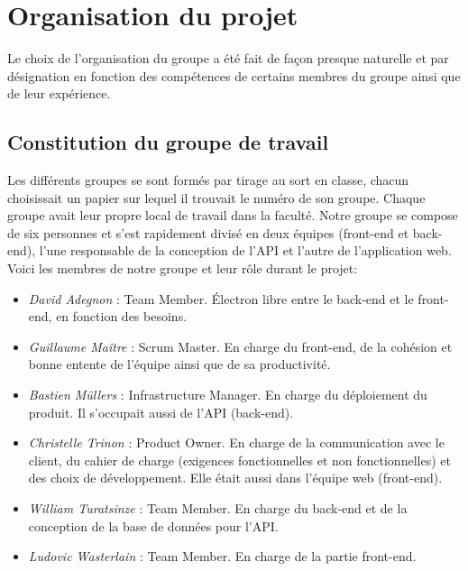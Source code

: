 \documentclass[t, 12pt, usenames,dvipsnames]{article}
\begin{document}
    \section{Organisation du projet}
        \noindent Le choix de l'organisation du groupe a été fait de façon presque naturelle et par désignation en fonction des compétences de certains membres du groupe ainsi que de leur expérience.
        
        \subsection{Constitution du groupe de travail}
            \noindent Les différents groupes se sont formés par tirage au sort en classe, chacun choisissait un papier sur lequel il trouvait le numéro de son groupe. Chaque groupe avait leur propre local de travail dans la faculté. Notre groupe se compose de six personnes et s'est rapidement divisé en deux équipes (front-end et back-end), l'une responsable de la conception de l'API et l'autre de l'application web. Voici les membres de notre groupe et leur rôle durant le projet:
                \begin{itemize}
                    \item \textit{David Adegnon} : Team Member. Électron libre entre le back-end et le front-end, en fonction des besoins.
                    \item \textit{Guillaume Maître} : Scrum Master. En charge du front-end, de la cohésion et bonne entente de l'équipe ainsi que de sa productivité.
                    \item \textit{Bastien Müllers} : Infrastructure Manager.  En charge du déploiement du produit. Il s'occupait aussi de l'API (back-end).
                    \item \textit{Christelle Trinon} : Product Owner. En charge de la communication avec le client, du cahier de charge (exigences fonctionnelles et non fonctionnelles) et des choix de développement. Elle était aussi dans l'équipe web (front-end).
                    \item \textit{William Turatsinze} : Team Member. En charge du back-end et de la conception de la base de données pour l'API.
                    \item \textit{Ludovic Wasterlain} : Team Member. En charge de la partie front-end.
                \end{itemize}
                
\end{document}
